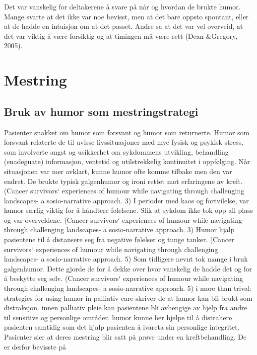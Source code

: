 Det var vanskelig for deltakerene å svare på når og hvordan de brukte humor.
Mange svarte at det ikke var noe bevisst, men at det bare oppsto spontant,
eller at de hadde en intuisjon om at det passet. Andre sa at det var vel
overveid, at det var viktig å være forsiktig og at timingen må være rett (Dean
\&{}Gregory, 2005).

\section{Mestring}

\subsection{Bruk av humor som mestringstrategi}

Pasienter snakket om humor som forsvant og humor som returnerte. Humor som
forsvant relaterte de til uvisse livssituasjoner med mye fysisk og psykisk
stress, som involverte angst og usikkerhet om sykdommens utvikling, behandling
(enadeguate) informasjon, ventetid og utilstrekkelig kontinuitet i oppfølging.
Når situasjonen var mer avklart, kunne humor ofte komme tilbake men den var
endret. De brukte typisk galgenhumor og ironi rettet mot
erfaringene av kreft.  (Cancer survivors` experiences of humour while
navigating through challenging landscapes-  a sosio-narrative approach. 3) I
perioder med kaos og fortvilelse, var humor særlig viktig for å håndtere
følelsene. Slik at sykdom ikke tok opp all plass og var overveldene.  (Cancer
survivors` experiences of humour while navigating through challenging
landscapes-  a sosio-narrative approach. 3) Humor hjalp pasientene til å
distansere seg fra negative følelser og tunge tanker.  (Cancer survivors`
experiences of humour while navigating through challenging landscapes-  a
sosio-narrative approach. 5) Som tidligere nevnt tok mange i bruk
galgenhumor. Dette gjorde de for å dekke over hvor vanskelig
de hadde det og for å beskytte seg selv. (Cancer survivors` experiences of
humour while navigating through challenging landscapes-  a sosio-narrative
approach.  5) i more than trival: strategies for using humor in palliativ care
skriver de at humor kan bli brukt som distraksjon. innen palliativ pleie kan
pasientene bli avhengige av hjelp fra andre til sensitive og personlige
områder. humor kunne her hjelpe til å distrahere pasienten samtidig som det
hjalp pasienten å ivareta sin personlige integritet.  Pasienter sier at deres
mestring blir satt på prøve under en kreftbehandling. De er derfor bevisste på
